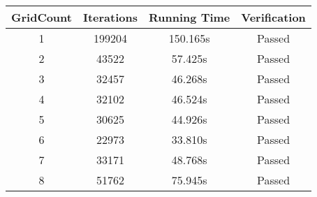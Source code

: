\begin{tabular}{c|ccc}
\toprule
 GridCount & Iterations & Running Time & Verification \\
\midrule
         1 &     199204 &     150.165s &       Passed \\
         2 &      43522 &      57.425s &       Passed \\
         3 &      32457 &      46.268s &       Passed \\
         4 &      32102 &      46.524s &       Passed \\
         5 &      30625 &      44.926s &       Passed \\
         6 &      22973 &      33.810s &       Passed \\
         7 &      33171 &      48.768s &       Passed \\
         8 &      51762 &      75.945s &       Passed \\
\bottomrule
\end{tabular}
